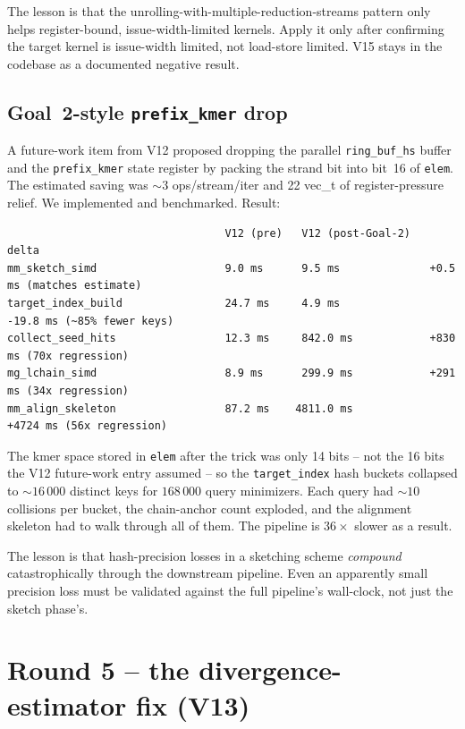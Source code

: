 The lesson is that the unrolling-with-multiple-reduction-streams
pattern only helps register-bound, issue-width-limited kernels.
Apply it only after confirming the target kernel is issue-width
limited, not load-store limited.  V15 stays in the codebase as a
documented negative result.

\subsection{Goal~2-style \texttt{prefix\_kmer} drop}

A future-work item from V12 proposed dropping the parallel
\texttt{ring\_buf\_hs} buffer and the \texttt{prefix\_kmer} state
register by packing the strand bit into bit~16 of \texttt{elem}.
The estimated saving was $\sim 3$ ops/stream/iter and 22 vec\_t of
register-pressure relief.  We implemented and benchmarked.  Result:

\begin{verbatim}
                                  V12 (pre)   V12 (post-Goal-2)   delta
mm_sketch_simd                    9.0 ms      9.5 ms              +0.5 ms (matches estimate)
target_index_build                24.7 ms     4.9 ms              -19.8 ms (~85% fewer keys)
collect_seed_hits                 12.3 ms     842.0 ms            +830 ms (70x regression)
mg_lchain_simd                    8.9 ms      299.9 ms            +291 ms (34x regression)
mm_align_skeleton                 87.2 ms    4811.0 ms            +4724 ms (56x regression)
\end{verbatim}

The kmer space stored in \texttt{elem} after the trick was only 14
bits -- not the 16 bits the V12 future-work entry assumed -- so the
\texttt{target\_index} hash buckets collapsed to $\sim 16\,000$
distinct keys for $168\,000$ query minimizers.  Each query had
$\sim 10$ collisions per bucket, the chain-anchor count exploded,
and the alignment skeleton had to walk through all of them.  The
pipeline is $36\times$ slower as a result.

The lesson is that hash-precision losses in a sketching scheme
\emph{compound} catastrophically through the downstream pipeline.
Even an apparently small precision loss must be validated against
the full pipeline's wall-clock, not just the sketch phase's.

\section{Round 5 -- the divergence-estimator fix (V13)}
\label{sec:v13-est-err}

